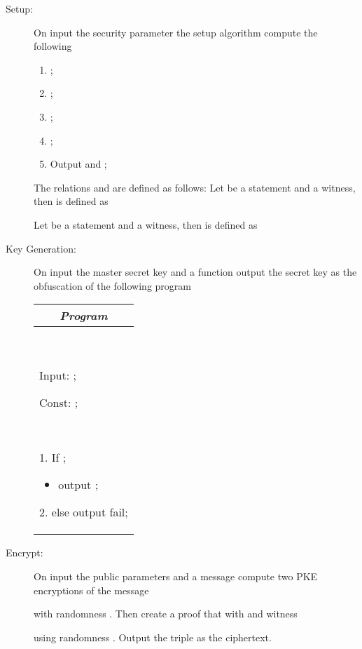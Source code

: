 \documentclass{llncs}
\begin{document}
\begin{description}
\item[Setup:] On input the security parameter  the setup algorithm compute the following
	\begin{enumerate}
	\item ;
	\item ;
	\item ;
	\item ;
	\item Output   and  ;
	\end{enumerate}

	The relations  and  are defined as follows: Let  be a statement and  a witness, then  is defined as
	
	
	Let  be a statement and  a witness, then  is defined as
	
	
	
\item[Key Generation:] On input the master secret key  and a function  output the secret key  as the obfuscation of the following program

\begin{center}
\begin{small}
    \begin{tabular}{| p{6cm} |}
	\hline
	\multicolumn{1}{|c|}{\textbf{\emph{Program} }} \\
	\hline 
	\
	
	Input: ; 
	
	Const: ;
	
	\

	1. If ;
	\begin{itemize}
		\item[] output ;
	\end{itemize}

	2. else output fail;

	\\
	\hline
	\end{tabular}
\end{small}
\end{center}


\item[Encrypt:] On input the public parameters  and a message  compute two PKE encryptions of the message
	
	with randomness .	Then create a proof  that  with  and witness  
	
	using randomness . 
	Output the triple  as the ciphertext.



\end{description}
\end{document}
